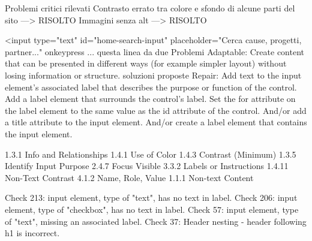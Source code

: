 \newpage

Problemi critici rilevati
    Contrasto errato tra colore e sfondo di alcune parti del sito ---> RISOLTO
    Immagini senza alt ---> RISOLTO
    
    <input type="text" id="home-search-input" placeholder="Cerca cause, progetti, partner..." onkeypress ...
    questa linea da due Problemi
        Adaptable: Create content that can be presented in different ways (for example simpler layout) without losing information or structure.
    soluzioni proposte
        Repair: Add text to the input element's associated label that describes the purpose or function of the control.
        Add a label element that surrounds the control's label. Set the for attribute on the label element to the same value as the id attribute of the control. And/or add a title attribute to the input element. And/or create a label element that contains the input element.
    
    1.3.1   
    Info and Relationships
    1.4.1
    Use of Color
    1.4.3
    Contrast (Minimum)
    1.3.5
    Identify Input Purpose
    2.4.7
    Focus Visible
    3.3.2
    Labels or Instructions
    1.4.11
    Non-Text Contrast
    4.1.2
    Name, Role, Value
    1.1.1
    Non-text Content


    Check 213: input element, type of "text", has no text in label.
    Check 206: input element, type of "checkbox", has no text in label.
    Check 57: input element, type of "text", missing an associated label.
    Check 37: Header nesting - header following h1 is incorrect.
        